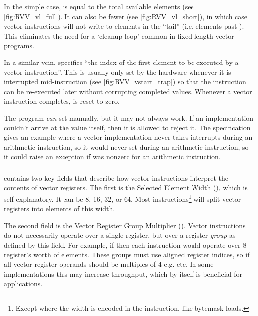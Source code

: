 In the simple case,  is equal to the total available elements (see \cref{fig:RVV_vl_full}).
It can also be fewer (see \cref{fig:RVV_vl_short}), in which case vector instructions will not write to elements in the \enquote{tail} (i.e. elements past ).
This eliminates the need for a `cleanup loop' common in fixed-length vector programs.


In a similar vein,  specifies \enquote{the index of the first element to be executed by a vector instruction}.
This is usually only set by the hardware whenever it is interrupted mid-instruction (see \cref{fig:RVV_vstart_trap}) so that the instruction can be re-executed later without corrupting completed values.
Whenever a vector instruction completes,  is reset to zero.

The program \emph{can} set  manually, but it may not always work.
If an implementation couldn't arrive at the value itself, then it is allowed to reject it.
The specification gives an example where a vector implementation never takes interrupts during an arithmetic instruction, so it would never set  during an arithmetic instruction, so it could raise an exception if  was nonzero for an arithmetic instruction.


\subsubsection{}
 contains two key fields that describe how vector instructions interpret the contents of vector registers.
The first is the Selected Element Width (), which is self-explanatory.
It can be 8, 16, 32, or 64.
Most instructions\footnote{Except where the width is encoded in the instruction, like bytemask loads.} will split vector registers into elements of this width.

The second field is the Vector Register Group Multiplier ().
Vector instructions do not necessarily operate over a single register, but over a register \emph{group} as defined by this field.
For example, if  then each instruction would operate over 8 register's worth of elements.
These groups must use aligned register indices, so if  all vector register operands should be multiples of 4 e.g.  etc.
In some implementations this may increase throughput, which by itself is beneficial for applications.

